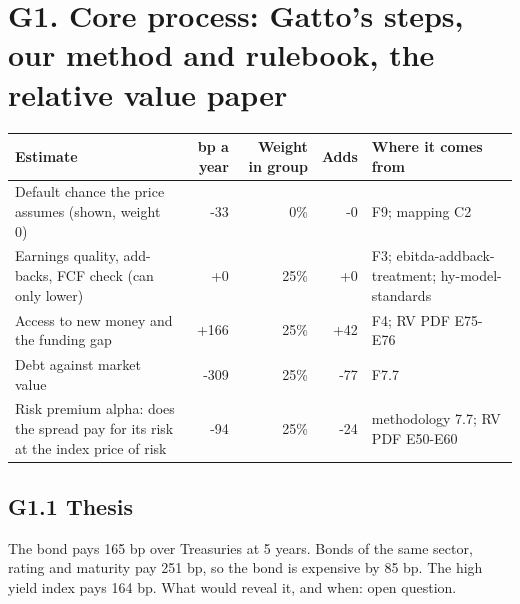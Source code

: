 \documentclass[11pt,a4paper]{article}
\begin{document}
\section*{G1. Core process: Gatto's steps, our method and rulebook, the relative value paper}
\par\noindent{}
\begin{center}\footnotesize\setlength{\tabcolsep}{3.5pt}\begin{tabular}{@{}p{6.2cm}rrrp{4.2cm}@{}}\toprule
Estimate & bp a year & Weight in group & Adds & Where it comes from \\\midrule
Default chance the price assumes (shown, weight 0) & -33 & 0\% & -0 & F9; mapping C2 \\
Earnings quality, add-backs, FCF check (can only lower) & +0 & 25\% & +0 & F3; ebitda-addback-treatment; hy-model-standards \\
Access to new money and the funding gap & +166 & 25\% & +42 & F4; RV PDF E75-E76 \\
Debt against market value & -309 & 25\% & -77 & F7.7 \\
Risk premium alpha: does the spread pay for its risk at the index price of risk & -94 & 25\% & -24 & methodology 7.7; RV PDF E50-E60 \\
\bottomrule\end{tabular}\end{center}
\subsection*{G1.1 Thesis}
The bond pays 165 bp over Treasuries at 5 years. Bonds of the same sector, rating and maturity pay 251 bp, so the bond is expensive by 85 bp. The high yield index pays 164 bp. What would reveal it, and when: open question.
\end{document}
